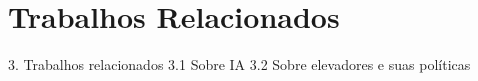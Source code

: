 \chapter{\label{chap:related}Trabalhos Relacionados}

3. Trabalhos relacionados
3.1 Sobre IA
3.2 Sobre elevadores e suas políticas